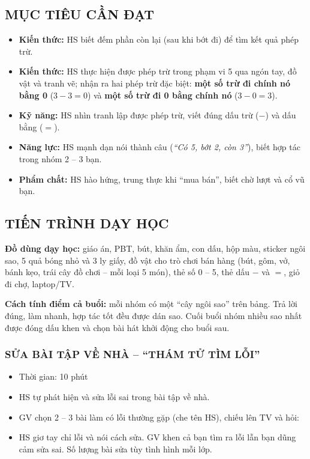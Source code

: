 \documentclass[../main.tex]{subfiles}
\begin{document}
\subsection{MỤC TIÊU CẦN ĐẠT}
\begin{itemize}
    \item \textbf{Kiến thức:} HS biết đếm phần còn lại (sau khi bớt đi) để tìm kết quả phép trừ.
    \item \textbf{Kiến thức:} HS thực hiện được phép trừ trong phạm vi 5 qua ngón tay, đồ vật và tranh vẽ; nhận ra hai phép trừ đặc biệt: \textbf{một số trừ đi chính nó bằng 0} ($3 - 3 = 0$) và \textbf{một số trừ đi 0 bằng chính nó} ($3 - 0 = 3$).
    \item \textbf{Kỹ năng:} HS nhìn tranh lập được phép trừ, viết đúng dấu trừ ($-$) và dấu bằng ($=$).
    \item \textbf{Năng lực:} HS mạnh dạn nói thành câu (\textit{“Có 5, bớt 2, còn 3”}), biết hợp tác trong nhóm 2 -- 3 bạn.
    \item \textbf{Phẩm chất:} HS hào hứng, trung thực khi “mua bán”, biết chờ lượt và cổ vũ bạn.
\end{itemize}

\subsection{TIẾN TRÌNH DẠY HỌC}
\textbf{Đồ dùng dạy học:} giáo án, PBT, bút, khăn ẩm, con dấu, hộp màu, sticker ngôi sao, 5 quả bóng nhỏ và 3 ly giấy, đồ vật cho trò chơi bán hàng (bút, gôm, vở, bánh kẹo, trái cây đồ chơi -- mỗi loại 5 món), thẻ số 0 -- 5, thẻ dấu $-$ và $=$, giỏ đi chợ, laptop/TV.

\begin{luuy}
    \textbf{Cách tính điểm cả buổi:} mỗi nhóm có một “cây ngôi sao” trên bảng. Trả lời đúng, làm nhanh, hợp tác tốt đều được dán sao. Cuối buổi nhóm nhiều sao nhất được đóng dấu khen và chọn bài hát khởi động cho buổi sau.
\end{luuy}

\subsubsection{SỬA BÀI TẬP VỀ NHÀ -- “THÁM TỬ TÌM LỖI”}
\begin{hd}
    \begin{itemize}
        \item Thời gian: 10 phút
        \item HS tự phát hiện và sửa lỗi sai trong bài tập về nhà.
    \end{itemize}
\end{hd}
\begin{itemize}
    \item GV chọn 2 -- 3 bài làm có lỗi thường gặp (che tên HS), chiếu lên TV và hỏi: 
    \item HS giơ tay chỉ lỗi và nói cách sửa. GV khen cả bạn tìm ra lỗi lẫn bạn dũng cảm sửa sai. Số lượng bài sửa tùy tình hình mỗi lớp.
\end{itemize}
\end{document}
